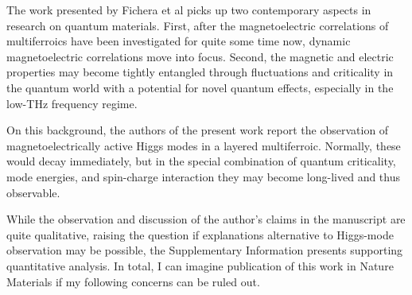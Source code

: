 The work presented by Fichera et al picks up two contemporary aspects in research on quantum materials. First, after the magnetoelectric correlations of multiferroics have been investigated for quite some time now, dynamic magnetoelectric correlations move into focus. Second, the magnetic and electric properties may become tightly entangled through fluctuations and criticality in the quantum world with a potential for novel quantum effects, especially in the low-THz frequency regime.

On this background, the authors of the present work report the observation of magnetoelectrically active Higgs modes in a layered multiferroic. Normally, these would decay immediately, but in the special combination of quantum criticality, mode energies, and spin-charge interaction they may become long-lived and thus observable.

While the observation and discussion of the author's claims in the manuscript are quite qualitative, raising the question if explanations alternative to Higgs-mode observation may be possible, the Supplementary Information presents supporting quantitative analysis. In total, I can imagine publication of this work in Nature Materials if my following concerns can be ruled out.
